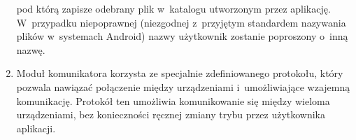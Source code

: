 \documentclass{article}
\begin{document}
\begin{enumerate}
{              pod którą zapisze odebrany plik w~katalogu utworzonym przez aplikację. \\
              W~przypadku niepoprawnej (niezgodnej z~przyjętym standardem nazywania 
              plików w~systemach Android) nazwy użytkownik zostanie poproszony 
              o~inną nazwę.}
        \item Moduł komunikatora korzysta ze specjalnie zdefiniowanego protokołu, 
              który pozwala nawiązać połączenie między urządzeniami i~umożliwiające
              wzajemną komunikację. Protokół ten umożliwia komunikowanie się 
              między wieloma urządzeniami, bez konieczności ręcznej zmiany trybu 
              przez użytkownika aplikacji.
    \end{enumerate}
    
\end{document}
